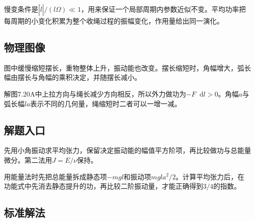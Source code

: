 \documentclass[UTF8,fontset=fandol,a4paper,11pt]{ctexart}
\newcommand{\dd}{\mathop{}\!\mathrm{d}}
\begin{document}
慢变条件是$|\dot l|/(l\Omega)\ll1$，用来保证一个局部周期内参数近似不变。平均功率把每周期的小变化积累为整个收绳过程的振幅变化，作用量给出同一演化。




\subsection*{物理图像}

图中缓慢缩短摆长，重物整体上升，振动能也改变。摆长缩短时，角幅增大，弧长幅由摆长与角幅的乘积决定，并随摆长减小。

解图7.20A中上拉方向与绳长减少方向相反，所以外力做功为$-F\dd l>0$。角幅$a$与弧长幅$la$表示不同的几何量，绳缩短时二者可以一增一减。




\subsection*{解题入口}

先用小角振动求平均张力，保留决定振动能的幅值平方阶项，再比较做功与总能量微分。第二法用\(J=E/\nu\)保持。

用能量法时先把总能量拆成静态项$-mgl$和振动项$mgla^2/2$。计算平均张力后，在功能式中先消去静态提升的功，再比较二阶振动量，才能正确得到$3/4$的指数。





\subsection*{标准解法}
\end{document}
